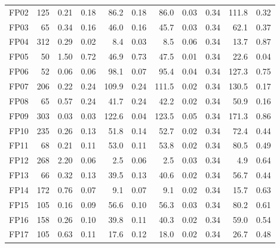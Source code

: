 \begin{longtable}[t]{lrrrrrrrrrr}
\hspace{1em}FP02 & 125 & 0.21 & 0.18 & 86.2 & 0.18 & 86.0 & 0.03 & 0.34 & 111.8 & 0.32\\
\hspace{1em}FP03 & 65 & 0.34 & 0.16 & 46.0 & 0.16 & 45.7 & 0.03 & 0.34 & 62.1 & 0.37\\
\hspace{1em}FP04 & 312 & 0.29 & 0.02 & 8.4 & 0.03 & 8.5 & 0.06 & 0.34 & 13.7 & 0.87\\
\hspace{1em}FP05 & 50 & 1.50 & 0.72 & 46.9 & 0.73 & 47.5 & 0.01 & 0.34 & 22.6 & 0.04\\
\hspace{1em}FP06 & 52 & 0.06 & 0.06 & 98.1 & 0.07 & 95.4 & 0.04 & 0.34 & 127.3 & 0.75\\
\hspace{1em}FP07 & 206 & 0.22 & 0.24 & 109.9 & 0.24 & 111.5 & 0.02 & 0.34 & 130.5 & 0.17\\
\hspace{1em}FP08 & 65 & 0.57 & 0.24 & 41.7 & 0.24 & 42.2 & 0.02 & 0.34 & 50.9 & 0.16\\
\hspace{1em}FP09 & 303 & 0.03 & 0.03 & 122.6 & 0.04 & 123.5 & 0.05 & 0.34 & 171.3 & 0.86\\
\hspace{1em}FP10 & 235 & 0.26 & 0.13 & 51.8 & 0.14 & 52.7 & 0.02 & 0.34 & 72.4 & 0.44\\
\hspace{1em}FP11 & 68 & 0.21 & 0.11 & 53.0 & 0.11 & 53.8 & 0.02 & 0.34 & 80.5 & 0.49\\
\hspace{1em}FP12 & 268 & 2.20 & 0.06 & 2.5 & 0.06 & 2.5 & 0.03 & 0.34 & 4.9 & 0.64\\
\hspace{1em}FP13 & 66 & 0.32 & 0.13 & 39.5 & 0.13 & 40.6 & 0.02 & 0.34 & 56.7 & 0.44\\
\hspace{1em}FP14 & 172 & 0.76 & 0.07 & 9.1 & 0.07 & 9.1 & 0.02 & 0.34 & 15.7 & 0.63\\
\hspace{1em}FP15 & 105 & 0.16 & 0.09 & 56.6 & 0.10 & 56.3 & 0.03 & 0.34 & 80.2 & 0.61\\
\hspace{1em}FP16 & 158 & 0.26 & 0.10 & 39.8 & 0.11 & 40.3 & 0.02 & 0.34 & 59.0 & 0.54\\
\hspace{1em}FP17 & 105 & 0.63 & 0.11 & 17.6 & 0.12 & 18.0 & 0.02 & 0.34 & 26.7 & 0.48\\

\end{longtable}

